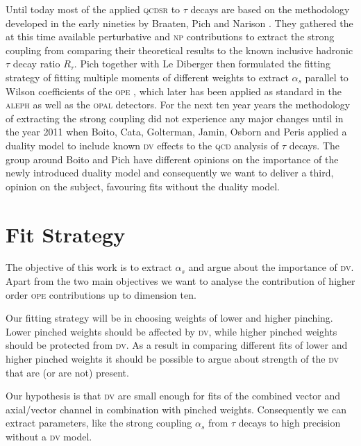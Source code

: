 \documentclass[../../index.tex]{subfiles}
\begin{document}
Until today most of the applied \textsc{qcdsr} to \(\tau\) decays are based on
the methodology developed in the early nineties by Braaten, Pich and Narison
\cite{Braaten1991}. They gathered the at this time available perturbative and
\textsc{np} contributions to extract the strong coupling from comparing their
theoretical results to the known inclusive hadronic \(\tau\) decay ratio
\(R_\tau\). Pich together with Le Diberger then formulated the fitting strategy
of fitting multiple moments of different weights to extract \(\alpha_s\)
parallel to Wilson coefficients of the \textsc{ope} \cite{LeDiberder1992}, which
later has been applied as standard in the \textsc{aleph} \cite{Aleph1993} as
well as the \textsc{opal} \cite{Opal1998} detectors. For the next ten year years
the methodology of extracting the strong coupling did not experience any major
changes until in the year 2011 when Boito, Cata, Golterman, Jamin, Osborn and
Peris \cite{Boito2011a} applied a duality model to include known \textsc{dv}
effects to the \textsc{qcd} analysis of \(\tau\) decays. The group around Boito
and Pich have different opinions on the importance of the newly introduced
duality model \cite{Pich2016,Boito2016,} and consequently we want to deliver a
third, opinion on the subject, favouring fits without the duality model.


\section{Fit Strategy}
The objective of this work is to extract \(\alpha_s\) and argue about the
importance of \textsc{dv}. Apart from the two main objectives we want to analyse
the contribution of higher order \textsc{ope} contributions up to dimension ten.

Our fitting strategy will be in choosing weights of lower and higher pinching.
Lower pinched weights should be affected by \textsc{dv}, while higher pinched
weights should be protected from \textsc{dv}. As a result in comparing different
fits of lower and higher pinched weights it should be possible to argue about
strength of the \textsc{dv} that are (or are not) present.

Our hypothesis is that \textsc{dv} are small enough for fits of the combined
vector and axial\-/vector channel in combination with pinched weights.
Consequently we can extract parameters, like the strong coupling \(\alpha_s\)
from \(\tau\) decays to high precision without a \textsc{dv} model.
\end{document}
